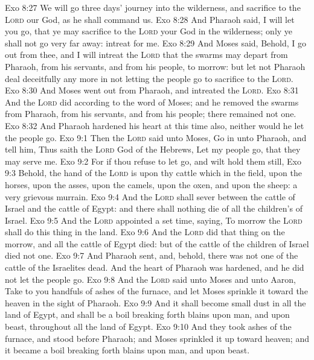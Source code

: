 \vs Exo 8:27 We will go three days' journey into the wilderness, and sacrifice to the \textsc{Lord} our God, as he shall command us.
\vs Exo 8:28 And Pharaoh said, I will let you go, that ye may sacrifice to the \textsc{Lord} your God in the wilderness; only ye shall not go very far away: intreat for me.
\vs Exo 8:29 And Moses said, Behold, I go out from thee, and I will intreat the \textsc{Lord} that the swarms  may depart from Pharaoh, from his servants, and from his people, to morrow: but let not Pharaoh deal deceitfully any more in not letting the people go to sacrifice to the \textsc{Lord}.
\vs Exo 8:30 And Moses went out from Pharaoh, and intreated the \textsc{Lord}.
\vs Exo 8:31 And the \textsc{Lord} did according to the word of Moses; and he removed the swarms  from Pharaoh, from his servants, and from his people; there remained not one.
\vs Exo 8:32 And Pharaoh hardened his heart at this time also, neither would he let the people go.
\vs Exo 9:1 Then the \textsc{Lord} said unto Moses, Go in unto Pharaoh, and tell him, Thus saith the \textsc{Lord} God of the Hebrews, Let my people go, that they may serve me.
\vs Exo 9:2 For if thou refuse to let  go, and wilt hold them still,
\vs Exo 9:3 Behold, the hand of the \textsc{Lord} is upon thy cattle which  in the field, upon the horses, upon the asses, upon the camels, upon the oxen, and upon the sheep:  a very grievous murrain.
\vs Exo 9:4 And the \textsc{Lord} shall sever between the cattle of Israel and the cattle of Egypt: and there shall nothing die of all  the children's of Israel.
\vs Exo 9:5 And the \textsc{Lord} appointed a set time, saying, To morrow the \textsc{Lord} shall do this thing in the land.
\vs Exo 9:6 And the \textsc{Lord} did that thing on the morrow, and all the cattle of Egypt died: but of the cattle of the children of Israel died not one.
\vs Exo 9:7 And Pharaoh sent, and, behold, there was not one of the cattle of the Israelites dead. And the heart of Pharaoh was hardened, and he did not let the people go.
\vs Exo 9:8 And the \textsc{Lord} said unto Moses and unto Aaron, Take to you handfuls of ashes of the furnace, and let Moses sprinkle it toward the heaven in the sight of Pharaoh.
\vs Exo 9:9 And it shall become small dust in all the land of Egypt, and shall be a boil breaking forth  blains upon man, and upon beast, throughout all the land of Egypt.
\vs Exo 9:10 And they took ashes of the furnace, and stood before Pharaoh; and Moses sprinkled it up toward heaven; and it became a boil breaking forth  blains upon man, and upon beast.
